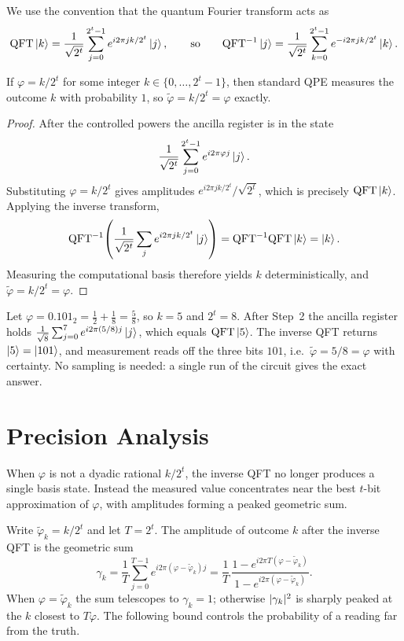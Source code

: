 We use the convention that the quantum Fourier transform acts as
\[
  \mathrm{QFT}\ket{k}=\frac{1}{\sqrt{2^{t}}}\sum_{j=0}^{2^{t}-1}e^{i2\pi jk/2^{t}}\ket{j},
  \qquad\text{so}\qquad
  \mathrm{QFT}^{-1}\ket{j}=\frac{1}{\sqrt{2^{t}}}\sum_{k=0}^{2^{t}-1}
    e^{-i2\pi jk/2^{t}}\ket{k}.
\]

\begin{theorem}
\label{l6:thm:exact}
If $\varphi=k/2^{t}$ for some integer $k\in\{0,\dots,2^{t}-1\}$, then standard
QPE measures the outcome $k$ with probability $1$, so $\tilde\varphi=k/2^{t}
=\varphi$ exactly.
\end{theorem}

\begin{proof}
After the controlled powers the ancilla register is in the state
\[
  \frac{1}{\sqrt{2^{t}}}\sum_{j=0}^{2^{t}-1}e^{i2\pi\varphi j}\ket{j}.
\]
Substituting $\varphi=k/2^{t}$ gives amplitudes $e^{i2\pi jk/2^{t}}/\sqrt{2^{t}}$,
which is precisely $\mathrm{QFT}\ket{k}$. Applying the inverse transform,
\[
  \mathrm{QFT}^{-1}\!\left(\frac{1}{\sqrt{2^{t}}}\sum_{j}e^{i2\pi jk/2^{t}}\ket{j}\right)
  =\mathrm{QFT}^{-1}\mathrm{QFT}\ket{k}=\ket{k}.
\]
Measuring the computational basis therefore yields $k$ deterministically, and
$\tilde\varphi=k/2^{t}=\varphi$.
\end{proof}

\begin{example}[Worked exact case, $t=3$]
Let $\varphi=0.101_2=\tfrac12+\tfrac18=\tfrac58$, so $k=5$ and $2^{t}=8$. After
Step~2 the ancilla register holds
$\tfrac{1}{\sqrt8}\sum_{j=0}^{7}e^{i2\pi(5/8)j}\ket{j}$, which equals
$\mathrm{QFT}\ket{5}$. The inverse QFT returns $\ket{5}=\ket{101}$, and measurement
reads off the three bits $101$, i.e.\ $\tilde\varphi=5/8=\varphi$ with certainty.
No sampling is needed: a single run of the circuit gives the exact answer.
\end{example}

\section{Precision Analysis}

When $\varphi$ is not a dyadic rational $k/2^{t}$, the inverse QFT no longer
produces a single basis state. Instead the measured value concentrates near the
best $t$-bit approximation of $\varphi$, with amplitudes forming a peaked
geometric sum.

Write $\tilde\varphi_{k}=k/2^{t}$ and let $T=2^{t}$. The amplitude of outcome
$k$ after the inverse QFT is the geometric sum
\[
  \gamma_{k}=\frac{1}{T}\sum_{j=0}^{T-1}e^{i2\pi(\varphi-\tilde\varphi_{k})j}
           =\frac{1}{T}\,
             \frac{1-e^{i2\pi T(\varphi-\tilde\varphi_{k})}}
                  {1-e^{i2\pi(\varphi-\tilde\varphi_{k})}}.
\]
When $\varphi=\tilde\varphi_{k}$ the sum telescopes to $\gamma_{k}=1$; otherwise
$\lvert\gamma_{k}\rvert^{2}$ is sharply peaked at the $k$ closest to $T\varphi$. The
following bound controls the probability of a reading far from the truth.

